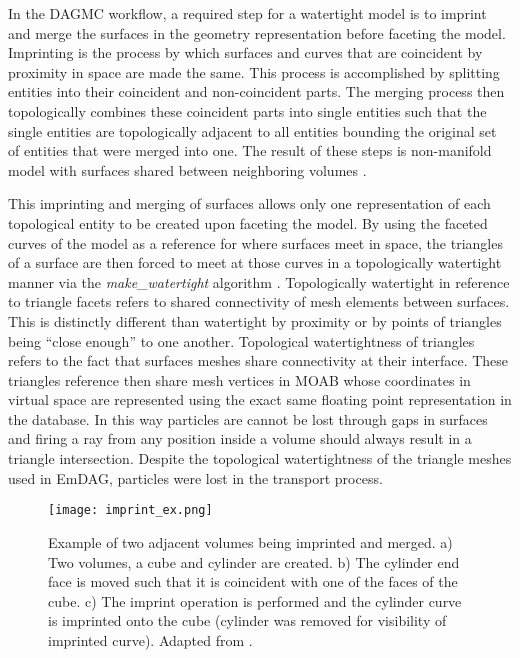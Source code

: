 In the DAGMC workflow, a required step for a watertight model is to imprint and
merge the surfaces in the geometry representation before faceting the
model. Imprinting is the process by which surfaces and curves that are
coincident by proximity in space are made the same. This process is accomplished
by splitting entities into their coincident and non-coincident parts. The
merging process then topologically combines these coincident parts into single
entities such that the single entities are topologically adjacent to all
entities bounding the original set of entities that were merged into one. The
result of these steps is non-manifold model with surfaces shared between
neighboring volumes \cite{Smith_2011}.

This imprinting and merging of surfaces allows only one representation of each
topological entity to be created upon faceting the model. By using the faceted
curves of the model as a reference for where surfaces meet in space, the
triangles of a surface are then forced to meet at those curves in a
topologically watertight manner via the \textit{make\_watertight} algorithm
\cite{Smith_2011}. Topologically watertight in reference to triangle facets
refers to shared connectivity of mesh elements between surfaces. This is
distinctly different than watertight by proximity or by points of triangles
being ``close enough'' to one another. Topological watertightness of triangles
refers to the fact that surfaces meshes share connectivity at their
interface. These triangles reference then share mesh vertices in MOAB whose
coordinates in virtual space are represented using the exact same floating point
representation in the database.  In this way particles are cannot be lost
through gaps in surfaces and firing a ray from any position inside a volume
should always result in a triangle intersection. Despite the topological
watertightness of the triangle meshes used in EmDAG, particles were lost in the
transport process.

\begin{figure}[H]
  \centering
  \texttt{[image: imprint\_ex.png]}
  \caption{Example of two adjacent volumes being imprinted and merged. a) Two
    volumes, a cube and cylinder are created. b) The cylinder end face is moved
    such that it is coincident with one of the faces of the cube. c) The imprint
    operation is performed and the cylinder curve is imprinted onto the cube
    (cylinder was removed for visibility of imprinted curve). Adapted from
    \cite{White_2002}.}
  \label{imprint_ex}
\end{figure}

